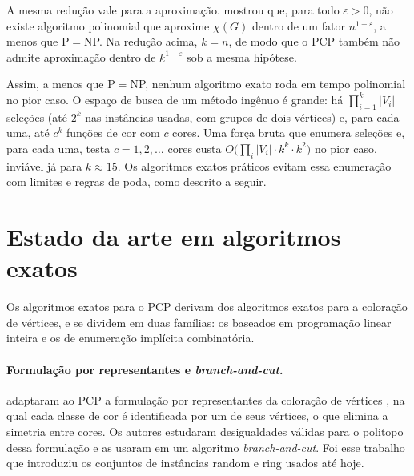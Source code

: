 \documentclass[12pt]{article}
\begin{document}
A mesma redução vale para a aproximação. \cite{zuckerman2007} mostrou que, para
todo $\varepsilon>0$, não existe algoritmo polinomial que aproxime $\chi(G)$
dentro de um fator $n^{1-\varepsilon}$, a menos que P${}={}$NP. Na redução
acima, $k=n$, de modo que o PCP também não admite aproximação dentro de
$k^{1-\varepsilon}$ sob a mesma hipótese.

Assim, a menos que P${}={}$NP, nenhum algoritmo exato roda em tempo polinomial
no pior caso. O espaço de busca de um método ingênuo é grande: há
$\prod_{i=1}^{k}|V_i|$ seleções (até $2^k$ nas instâncias usadas, com grupos de
dois vértices) e, para cada uma, até $c^k$ funções de cor com $c$ cores. Uma
força bruta que enumera seleções e, para cada uma, testa
$c=1,2,\dots$ cores custa $O\big(\prod_i|V_i|\cdot k^{k}\cdot k^2\big)$ no pior
caso, inviável já para $k\approx 15$. Os algoritmos exatos práticos evitam
essa enumeração com limites e regras de poda, como descrito a seguir.

\section{Estado da arte em algoritmos exatos}\label{sec:literatura}

Os algoritmos exatos para o PCP derivam dos algoritmos exatos para a coloração
de vértices, e se dividem em duas famílias: os baseados em programação linear
inteira e os de enumeração implícita combinatória.

\paragraph{Formulação por representantes e \emph{branch-and-cut}.}
\cite{frota2010} adaptaram ao PCP a formulação por representantes da coloração
de vértices \cite{campelo2008}, na qual cada classe de cor é identificada por
um de seus vértices, o que elimina a simetria entre cores. Os autores
estudaram desigualdades válidas para o politopo dessa formulação e as usaram
em um algoritmo \emph{branch-and-cut}. Foi esse trabalho que introduziu os
conjuntos de instâncias random e ring usados até hoje.
\end{document}
